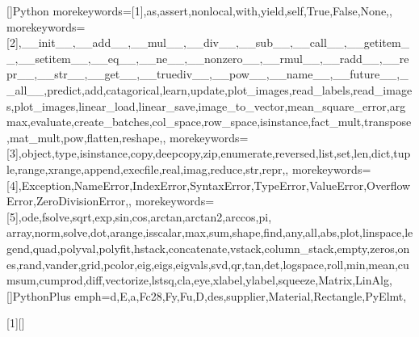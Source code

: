 []{Python}{
  morekeywords=[1]{,as,assert,nonlocal,with,yield,self,True,False,None,}, %
  morekeywords=[2]{,__init__,__add__,__mul__,__div__,__sub__,__call__,__getitem__,__setitem__,__eq__,__ne__,__nonzero__,__rmul__,__radd__,__repr__,__str__,__get__,__truediv__,__pow__,__name__,__future__,__all__,predict,add,catagorical,learn,update,plot_images,read_labels,read_images,plot_images,linear_load,linear_save,image_to_vector,mean_square_error,argmax,evaluate,create_batches,col_space,row_space,isinstance,fact_mult,transpose,mat_mult,pow,flatten,reshape,}, %
  morekeywords=[3]{,object,type,isinstance,copy,deepcopy,zip,enumerate,reversed,list,set,len,dict,tuple,range,xrange,append,execfile,real,imag,reduce,str,repr,}, %
  morekeywords=[4]{,Exception,NameError,IndexError,SyntaxError,TypeError,ValueError,OverflowError,ZeroDivisionError,}, %
  morekeywords=[5]{,ode,fsolve,sqrt,exp,sin,cos,arctan,arctan2,arccos,pi,
  array,norm,solve,dot,arange,isscalar,max,sum,shape,find,any,all,abs,plot,linspace,legend,quad,polyval,polyfit,hstack,concatenate,vstack,column_stack,empty,zeros,ones,rand,vander,grid,pcolor,eig,eigs,eigvals,svd,qr,tan,det,logspace,roll,min,mean,cumsum,cumprod,diff,vectorize,lstsq,cla,eye,xlabel,ylabel,squeeze,Matrix,LinAlg}, %
}
[]{PythonPlus}{
  emph={d,E,a,Fc28,Fy,Fu,D,des,supplier,Material,Rectangle,PyElmt},
}


\newcommand\pythonstyle{\lstset{
style=colorEX,
language=PyBrIM,
}}


[1][]
{
\pythonstyle
\lstset{#1}
}
{}


\newcommand\pythonexternal[2][]{{
\pythonstyle
}}

\newcommand\pythoninline[1]{{\pythonstyle\lstinline!#1!}}


